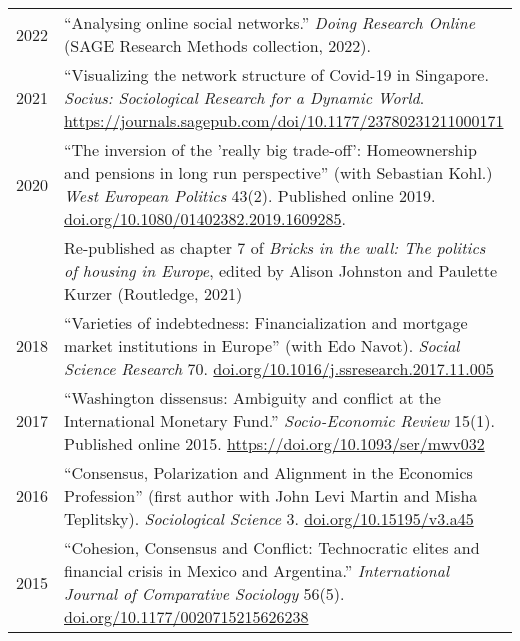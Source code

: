 \documentclass[12pt,letterpaper]{article}
\begin{document}
\begin{tabulary}{.97\textwidth}{@{}p{2.5cm}  L}
2022 & ``Analysing online social networks.''  \textit{Doing Research Online} (SAGE Research Methods collection, 2022).  \\
2021 & ``Visualizing the network structure of Covid-19 in Singapore. \textit{Socius: Sociological Research for a Dynamic World}. \url{https://journals.sagepub.com/doi/10.1177/23780231211000171}\vspace{0.2cm}\\	
2020 & ``The inversion of the 'really big trade-off': Homeownership and pensions in long run perspective'' (with Sebastian Kohl.) \emph{West European Politics} 43(2).  Published online 2019.  \url{doi.org/10.1080/01402382.2019.1609285}.\vspace{0.2cm}\\  & Re-published as chapter 7 of \textit{Bricks in the wall: The politics of housing in Europe}, edited by Alison Johnston and Paulette Kurzer (Routledge, 2021) \vspace{0.2cm}\\
2018 & ``Varieties of indebtedness: Financialization and mortgage market institutions in Europe'' (with Edo Navot).  \emph{Social Science Research} 70.  \url{doi.org/10.1016/j.ssresearch.2017.11.005}\vspace{0.2cm}\\
2017 &``Washington dissensus: Ambiguity and conflict at the International Monetary Fund.'' \emph{Socio-Economic Review} 15(1).  Published online 2015.  \url{https://doi.org/10.1093/ser/mwv032}\vspace{0.2cm} \\
2016 & ``Consensus, Polarization and Alignment in the Economics Profession'' (first author with John Levi Martin and Misha Teplitsky). \emph{Sociological Science} 3.  \url{doi.org/10.15195/v3.a45}\vspace{0.2cm} \\
2015 & ``Cohesion, Consensus and Conflict: Technocratic elites and financial crisis in Mexico and Argentina.'' \emph{International Journal of Comparative Sociology} 56(5).  \url{doi.org/10.1177/0020715215626238} \vspace{0.2cm}\\
\end{tabulary}
\end{document}
